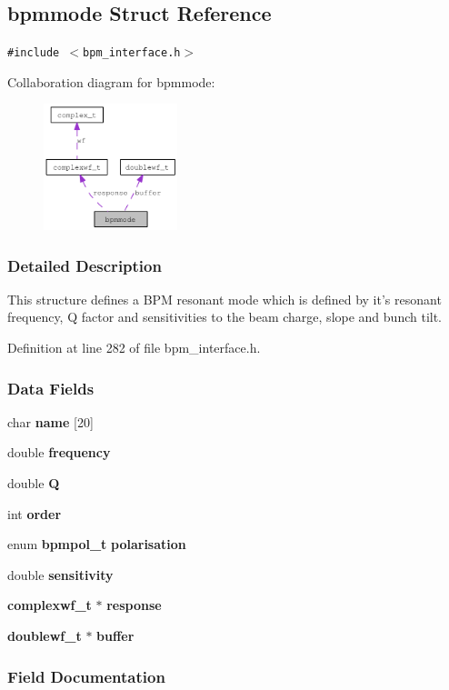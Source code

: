 \subsection{bpmmode Struct Reference}
\label{structbpmmode}
{\tt \#include $<$bpm\_\-interface.h$>$}

Collaboration diagram for bpmmode:\nopagebreak
\begin{figure}[H]
\begin{center}
\leavevmode
\includegraphics[width=110pt]{structbpmmode__coll__graph}
\end{center}
\end{figure}


\subsubsection{Detailed Description}
This structure defines a BPM resonant mode which is defined by it's resonant frequency, Q factor and sensitivities to the beam charge, slope and bunch tilt. 

Definition at line 282 of file bpm\_\-interface.h.\subsubsection*{Data Fields}
\begin{CompactItemize}
\item 
char {\bf name} [20]
\item 
double {\bf frequency}
\item 
double {\bf Q}
\item 
int {\bf order}
\item 
enum {\bf bpmpol\_\-t} {\bf polarisation}
\item 
double {\bf sensitivity}
\item 
{\bf complexwf\_\-t} $\ast$ {\bf response}
\item 
{\bf doublewf\_\-t} $\ast$ {\bf buffer}
\end{CompactItemize}


\subsubsection{Field Documentation}
